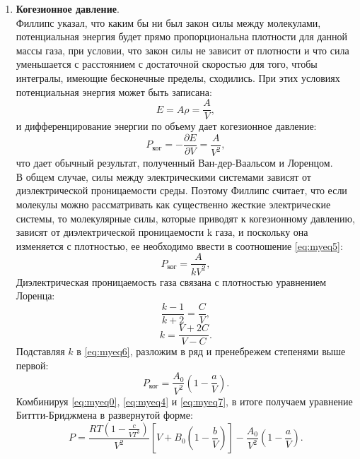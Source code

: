 \documentclass[a4paper]{article}
\numberwithin{equation}{subsection} %
\begin{document}
\begin{enumerate}
\item \textbf{Когезионное давление}. \\
Филлипс указал, что каким бы ни был
закон силы между молекулами, потенциальная энергия будет
прямо пропорциональна плотности для данной массы газа, при условии,
что закон силы не зависит от плотности и что
сила уменьшается с расстоянием с достаточной скоростью для того, чтобы интегралы,
имеющие бесконечные пределы, сходились. При этих условиях
потенциальная энергия может быть записана:
\begin{equation}
E = A\rho = \frac{A}{V},
\end{equation}
и дифференцирование энергии по объему дает когезионное давление:
\begin{equation}
P_{\text{ког}} = - \frac{\partial E}{\partial V} = \frac{A}{V^2} \label{eq:myeq5},
\end{equation}
что дает обычный результат, полученный Ван-дер-Ваальсом и Лоренцом.\\
В общем случае, силы между электрическими системами зависят
от диэлектрической проницаемости среды. Поэтому Филлипс
считает, что если молекулы можно рассматривать как существенно
жесткие электрические системы, то молекулярные силы, которые приводят к когезионному давлению, зависят от диэлектрической проницаемости k газа, и поскольку она изменяется с плотностью, ее необходимо ввести в соотношение \ref{eq:myeq5}:
\begin{equation}
P_{\text{ког}} = \frac{A}{kV^2} \label{eq:myeq6},
\end{equation}
Диэлектрическая проницаемость газа связана с плотностью уравнением Лоренца:
\begin{equation*}
\frac{k - 1}{k + 2} = \frac{C}{V},
\end{equation*}
\begin{equation}
k = \frac{V + 2C}{V - C}.
\end{equation}
Подставляя $k$ в \ref{eq:myeq6}, разложим в ряд и пренебрежем степенями выше первой:
\begin{equation}
P_{\text{ког}} = \frac{A_0}{V^2}\left( 1 - \frac{a}{V}\right) \label{eq:myeq7}.
\end{equation}
Комбинируя \ref{eq:myeq0}, \ref{eq:myeq4} и \ref{eq:myeq7}, в итоге получаем уравнение Биттти-Бриджмена в развернутой форме:
\begin{equation}
P = \frac{RT(1 - \frac{c}{VT^3})}{V^2}\left[V + B_0\left(1 - \frac{b}{V}\right)\right] - \frac{A_0}{V^2}\left(1 - \frac{a}{V}\right).
\end{equation}
\end{enumerate}
\clearpage
\end{document}
